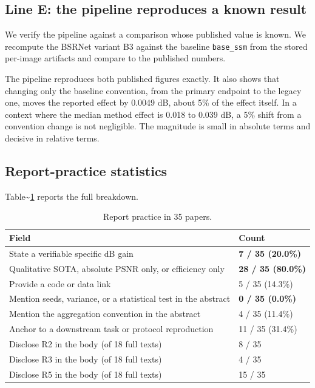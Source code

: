 \documentclass[pdflatex,sn-nature]{sn-jnl}
\newlength{\tblavail}
\begin{document}
\subsection{Line E: the pipeline reproduces a known result}\label{sec:anchor}

We verify the pipeline against a comparison whose published value is known. We recompute the BSRNet variant B3 against the baseline \texttt{base\_\allowbreak ssm} from the stored per-image artifacts and compare to the published numbers.

The pipeline reproduces both published figures exactly. It also shows that changing only the baseline convention, from the primary endpoint to the legacy one, moves the reported effect by 0.0049 dB, about 5\% of the effect itself. In a context where the median method effect is 0.018 to 0.039 dB, a 5\% shift from a convention change is not negligible. The magnitude is small in absolute terms and decisive in relative terms.

\subsection{Report-practice statistics}\label{sec:survey}

Table\textasciitilde{}\ref{tab:practice} reports the full breakdown.

\begin{table}[htbp]
\centering
\small
\setlength{\tabcolsep}{3pt}
\setlength{\tblavail}{\dimexpr\textwidth-4\tabcolsep\relax}
\begin{tabular}{p{0.676\tblavail}p{0.294\tblavail}}
\hline
Field & Count \\
\hline
State a verifiable specific dB gain & \textbf{7 / 35 (20.0\%)} \\
Qualitative SOTA, absolute PSNR only, or efficiency only & \textbf{28 / 35 (80.0\%)} \\
Provide a code or data link & 5 / 35 (14.3\%) \\
Mention seeds, variance, or a statistical test in the abstract & \textbf{0 / 35 (0.0\%)} \\
Mention the aggregation convention in the abstract & 4 / 35 (11.4\%) \\
Anchor to a downstream task or protocol reproduction & 11 / 35 (31.4\%) \\
Disclose R2 in the body (of 18 full texts) & 8 / 35 \\
Disclose R3 in the body (of 18 full texts) & 4 / 35 \\
Disclose R5 in the body (of 18 full texts) & 15 / 35 \\
\hline
\end{tabular}
\caption{Report practice in 35 papers.}\label{tab:practice}
\end{table}
\end{document}
